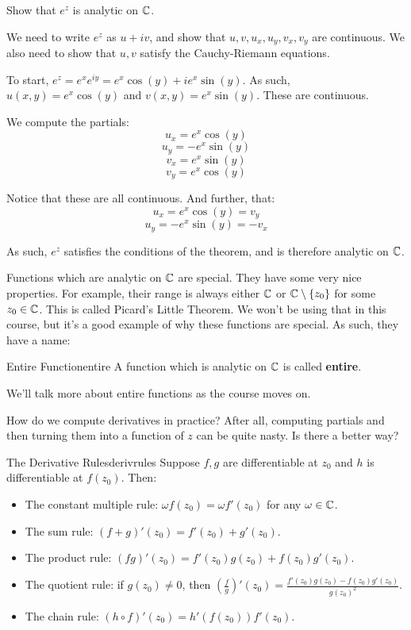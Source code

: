 \begin{ex}{}{} Show that $e^z$ is analytic on $\mathbb{C}$.

We need to write $e^z$ as $u + iv$, and show that $u,v, u_x, u_y, v_x, v_y$ are continuous. We also need to show that $u,v$ satisfy the Cauchy-Riemann equations.

To start, $e^z = e^{x}e^{iy} = e^x\cos(y) + ie^x\sin(y)$. As such, $u(x,y) = e^x\cos(y)$ and $v(x,y) = e^x\sin(y)$. These are continuous.

We compute the partials:
$$u_x = e^x\cos(y)$$
$$u_y = -e^x\sin(y)$$
$$v_x = e^x\sin(y)$$
$$v_y = e^x\cos(y)$$


Notice that these are all continuous. And further, that:
$$u_x = e^x\cos(y) = v_y$$
$$u_y = -e^x\sin(y) = -v_x$$

As such, $e^z$ satisfies the conditions of the theorem, and is therefore analytic on $\mathbb{C}$.
\end{ex}

Functions which are analytic on $\mathbb{C}$ are special. They have some very nice properties. For example, their range is always either $\mathbb{C}$ or $\mathbb{C}\setminus\{z_0\}$ for some $z_0\in\mathbb{C}$. This is called Picard's Little Theorem. We won't be using that in this course, but it's a good example of why these functions are special. As such, they have a name:

\begin{defbo}{Entire Function}{entire}
A function which is analytic on $\mathbb{C}$ is called {\bf entire}.
\end{defbo}

We'll talk more about entire functions as the course moves on.

How do we compute derivatives in practice? After all, computing partials and then turning them into a function of $z$ can be quite nasty. Is there a better way?

\begin{thmbo}{The Derivative Rules}{derivrules}
Suppose $f,g$ are differentiable at $z_0$ and $h$ is differentiable at $f(z_0)$. Then:

\begin{itemize}
\item The constant multiple rule: $\omega f(z_0) = \omega f'(z_0)$ for any $\omega \in \mathbb{C}$.
\item The sum rule: $(f+g)'(z_0) = f'(z_0) + g'(z_0)$.
\item The product rule: $(fg)'(z_0) = f'(z_0)g(z_0) + f(z_0)g'(z_0)$.
\item The quotient rule: if $g(z_0) \ne 0$, then $\left(\frac{f}{g}\right)'(z_0) = \frac{f'(z_0)g(z_0) - f(z_0)g'(z_0)}{g(z_0)^2}$.
\item The chain rule: $(h\circ f)'(z_0) = h'(f(z_0))f'(z_0)$.
\end{itemize}
\end{thmbo}

